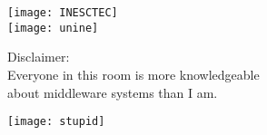 



\begin{frame}[plain]
  
\titlepage

\vspace{-1cm}

\begin{center}
\hspace{-4.5cm}\texttt{[image: INESCTEC]}\\ \vspace{-2.5cm}\hspace{4.5cm}
\texttt{[image: unine]}
\end{center}

\end{frame}


\begin{frame}[plain]{}

\begin{snugshade}
  \begin{center}
    Disclaimer: \\Everyone in this room is more knowledgeable \\ about middleware systems than I am.
  \end{center}
\end{snugshade}


\vspace{1cm}

\begin{center}
\texttt{[image: stupid]}  
\end{center}

\end{frame}


\subtitle[Introduction]{Introduction}


